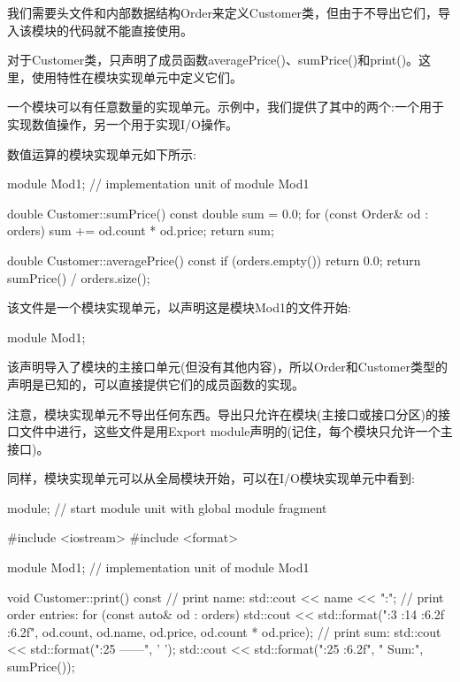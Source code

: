我们需要头文件和内部数据结构Order来定义Customer类，但由于不导出它们，导入该模块的代码就不能直接使用。

对于Customer类，只声明了成员函数averagePrice()、sumPrice()和print()。这里，使用特性在模块实现单元中定义它们。


一个模块可以有任意数量的实现单元。示例中，我们提供了其中的两个:一个用于实现数值操作，另一个用于实现I/O操作。

数值运算的模块实现单元如下所示:


\begin{cpp}
module Mod1; // implementation unit of module Mod1

double Customer::sumPrice() const
{
	double sum = 0.0;
	for (const Order& od : orders) {
		sum += od.count * od.price;
	}
	return sum;
}

double Customer::averagePrice() const
{
	if (orders.empty()) {
		return 0.0;
	}
	return sumPrice() / orders.size();
}
\end{cpp}

该文件是一个模块实现单元，以声明这是模块Mod1的文件开始:

\begin{cpp}
module Mod1;
\end{cpp}

该声明导入了模块的主接口单元(但没有其他内容)，所以Order和Customer类型的声明是已知的，可以直接提供它们的成员函数的实现。

注意，模块实现单元不导出任何东西。导出只允许在模块(主接口或接口分区)的接口文件中进行，这些文件是用Export module声明的(记住，每个模块只允许一个主接口)。

同样，模块实现单元可以从全局模块开始，可以在I/O模块实现单元中看到:


\begin{cpp}
module; // start module unit with global module fragment

#include <iostream>
#include <format>

module Mod1; // implementation unit of module Mod1

void Customer::print() const
{
	// print name:
	std::cout << name << ":\n";
	// print order entries:
	for (const auto& od : orders) {
		std::cout << std::format("{:3} {:14} {:6.2f} {:6.2f}\n",
								  od.count, od.name, od.price, od.count * od.price);
	}
	// print sum:
	std::cout << std::format("{:25} ------\n", ' ');
	std::cout << std::format("{:25} {:6.2f}\n", " Sum:", sumPrice());
}
\end{cpp}

